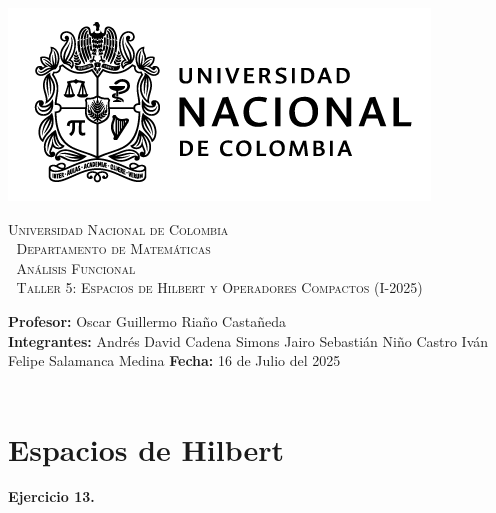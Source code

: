 \thispagestyle{empty}

\begin{minipage}{0.3\textwidth}
  \includegraphics[scale=0.35]{logounal.png}
\end{minipage}%
\hfill
\begin{minipage}{0.65\textwidth}
  \begin{center}
    \scshape
    \Large \textsc{Universidad Nacional de Colombia} \\
    \textcolor{white}{\tiny.} \Large \textsc{Departamento de Matemáticas} \\
    \textcolor{white}{\tiny.} \large \textsc{Análisis Funcional} \\
    \textcolor{white}{\tiny.} \large \textsf{Taller 5: Espacios de Hilbert y Operadores Compactos} \normalsize (I-2025)
  \end{center}
\end{minipage}

\vspace{0.3cm}
\normalfont

\textbf{Profesor:} Oscar Guillermo Riaño Castañeda\\
\textbf{Integrantes:} Andrés David Cadena Simons \hspace{2.8cm}  Jairo Sebastián Niño Castro\hspace{2.8cm}
Iván Felipe Salamanca Medina \hspace{5.05cm}\textbf{Fecha:} 16 de Julio del 2025\\
\vspace{0.25cm}\\

\section{Espacios de Hilbert}

\textbf{Ejercicio 13.}

